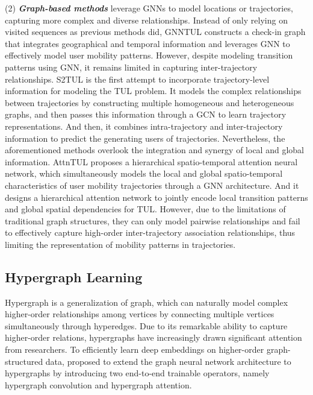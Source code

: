 (2) \textbf{\textit{Graph-based methods}} leverage GNNs to model locations or trajectories, capturing more complex and diverse relationships. Instead of only relying on visited sequences as previous methods did, GNNTUL \cite{gnntul} constructs a check-in graph that integrates geographical and temporal information and leverages GNN to effectively model user mobility patterns. However, despite modeling transition patterns using GNN, it remains limited in capturing inter-trajectory relationships.
S2TUL \cite{s2tul} is the first attempt to incorporate trajectory-level information for modeling the TUL problem. It models the complex relationships between trajectories by constructing multiple homogeneous and heterogeneous graphs, and then passes this information through a GCN to learn trajectory representations. And then, it combines intra-trajectory and inter-trajectory information to predict the generating users of trajectories.
Nevertheless, the aforementioned methods overlook the integration and synergy of local and global information. AttnTUL \cite{attntul} proposes a hierarchical spatio-temporal attention neural network, which simultaneously models the local and global spatio-temporal characteristics of user mobility trajectories through a GNN architecture. And it designs a hierarchical attention network to jointly encode local transition patterns and global spatial dependencies for TUL. However, due to the limitations of traditional graph structures, they can only model pairwise relationships and fail to effectively capture high-order inter-trajectory association relationships, thus limiting the representation of mobility patterns in trajectories.

\subsection{Hypergraph Learning}

Hypergraph \cite{hycn}\cite{hygnn}\cite{hgnn+} is a generalization of graph, which can naturally model complex higher-order relationships among vertices by connecting multiple vertices simultaneously through hyperedges. Due to its remarkable ability to capture higher-order relations, hypergraphs have increasingly drawn significant attention from researchers. To efficiently learn deep embeddings on higher-order graph-structured data, \cite{hycn} proposed to extend the graph neural network architecture to hypergraphs by introducing two end-to-end trainable operators, namely hypergraph convolution and hypergraph attention.

